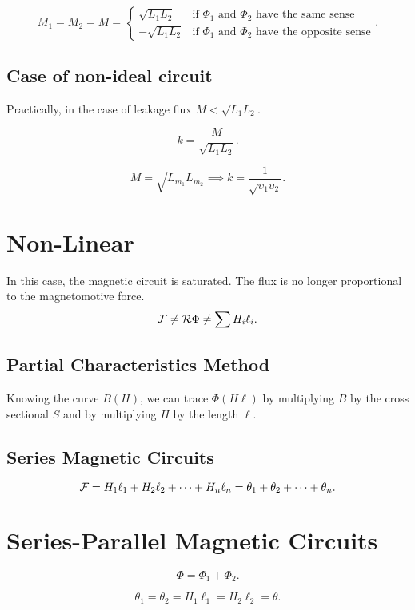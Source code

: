 \documentclass{report}
\begin{document}
\[
	M_1 = M_2 = M = \begin{cases}
		\sqrt{L_1 L_2}  & \text{if \(\Phi_1\) and \(\Phi_2\) have the same sense}     \\
		-\sqrt{L_1 L_2} & \text{if \(\Phi_1\) and \(\Phi_2\) have the opposite sense}
	\end{cases}
	.\]

\subsection{Case of non-ideal circuit}

Practically, in the case of leakage flux $M<\sqrt{L_1 L_2}$.

\[
	k = \frac{M}{\sqrt{L_1 L_2}}
	.\]

\[
	M = \sqrt{L_{m_1} L_{m_2}} \implies k = \frac{1}{\sqrt{\upsilon_1 \upsilon_2}}
	.\]

\section{Non-Linear}

In this case, the magnetic circuit is saturated. The flux is no longer proportional to the magnetomotive force.
\[
	\mathcal F \neq \mathcal{R} \Phi \neq \sum H_i \ell_i
	.\]

\subsection{Partial Characteristics Method}

Knowing the curve $B(H)$, we can trace $\Phi(H\ell)$ by multiplying $B$ by the cross sectional $S$ and by multiplying $H$ by the length $\ell$.

\subsection{Series Magnetic Circuits}

\[
	\mathcal F = H_1 \ell_1 + H_2 \ell_2 + \cdots + H_n \ell_n = \theta_1 + \theta_2 + \cdots + \theta_n
	.\]

\section{Series-Parallel Magnetic Circuits}

\[
	\Phi = \Phi_1 + \Phi_2
	.\]

\[
	\theta_1 = \theta_2 = H_1 \ell_1 = H_2 \ell_2 = \theta
	.\]
\end{document}
